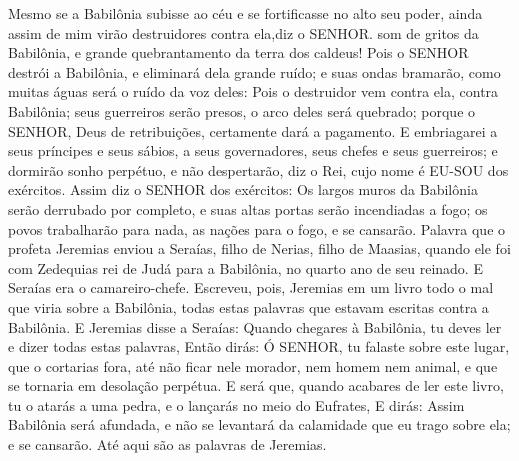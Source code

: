 {Mesmo se a Babilônia subisse ao céu e se fortificasse no alto seu poder, ainda assim de mim virão destruidores contra ela,diz o SENHOR.
 som de gritos da Babilônia, e grande quebrantamento da terra dos caldeus!
Pois o SENHOR destrói a Babilônia, e eliminará dela
{} grande ruído; e suas ondas bramarão, como muitas águas será o ruído da voz deles:
Pois o destruidor vem contra ela, contra Babilônia; seus guerreiros serão presos, o arco deles será quebrado; porque o SENHOR, Deus de retribuições, certamente dará a pagamento.
E embriagarei a seus príncipes e seus sábios, a seus governadores, seus chefes e seus guerreiros; e dormirão sonho perpétuo, e não despertarão, diz o Rei, cujo nome é EU-SOU dos exércitos.
Assim diz o SENHOR dos exércitos: Os largos muros da Babilônia serão derrubado por completo, e suas altas portas serão incendiadas a fogo; os povos trabalharão para nada, as nações para o fogo, e se cansarão.
Palavra que o profeta Jeremias enviou a Seraías, filho de Nerias, filho de Maasias, quando ele foi com Zedequias rei de Judá para a Babilônia, no quarto ano de seu reinado. E Seraías era o camareiro-chefe.
Escreveu, pois, Jeremias em um livro todo o mal que viria sobre a Babilônia, todas estas palavras que estavam escritas contra a Babilônia.
E Jeremias disse a Seraías: Quando chegares à Babilônia, tu deves ler e dizer todas estas palavras,
Então dirás: Ó SENHOR, tu falaste sobre este lugar, que o cortarias fora, até não ficar nele morador, nem homem nem animal, e que se tornaria em desolação perpétua.
E será que, quando acabares de ler este livro, tu o atarás a uma pedra, e o lançarás no meio do Eufrates,
E dirás: Assim Babilônia será afundada, e não se levantará da calamidade
 que eu trago sobre ela; e se cansarão. Até aqui são as palavras de Jeremias.

\par }

